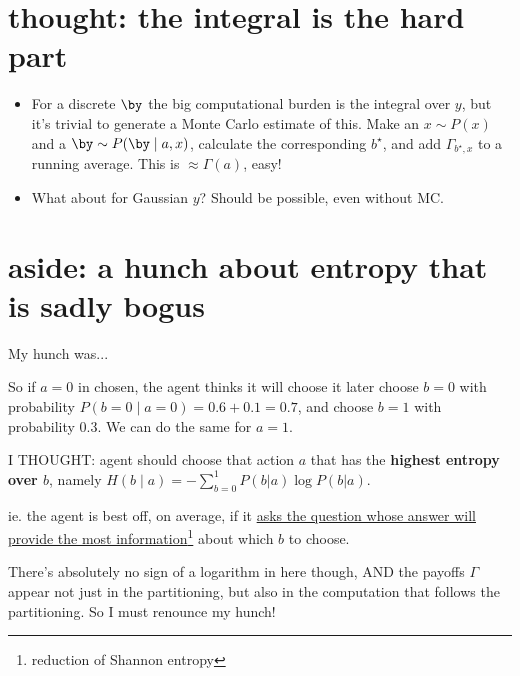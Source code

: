 \documentclass[11pt]{article}
\begin{document}
\Line
\section{thought: the integral is the hard part}
\begin{itemize}
\item For a discrete $\by$ the big computational burden is the integral over
$y$, but it's trivial to generate a Monte Carlo estimate of this. Make an $x \sim P(x)$ and a $\by \sim P(\by \mid a,x)$, calculate the corresponding $b^\star$, and add $\Gamma_{b^\star,x}$ to a running average. This is $\approx \Gamma(a)$, easy!
\item What about for Gaussian $y$? Should be possible, even without MC.
\end{itemize}

\Line
\section{aside: a hunch about entropy that is sadly bogus}

My hunch was...

So if $a=0$ in chosen, the agent thinks it will choose it later choose $b=0$
 with probability $P(b=0\mid a=0) = 0.6+0.1=0.7$, and choose $b=1$ with probability 0.3. We can do the same for $a=1$.

 I THOUGHT: agent should choose that action $a$ that has the {\bf
   highest entropy over $b$}, namely $H(b\mid a) = -\sum_{b=0}^1
 P(b|a) \log P(b|a)$.

ie. the agent is best off, on average, if it \underline{asks the question whose
answer will provide the most information}\footnote{reduction of Shannon
entropy} about which $b$ to choose.

There's absolutely no sign of a logarithm in here though, AND the
payoffs $\Gamma$ appear not just in the partitioning, but also in the
computation that follows the partitioning. So I must renounce my
hunch!



\end{document}
